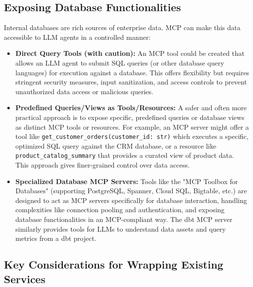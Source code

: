 \subsection*{Exposing Database Functionalities}
Internal databases are rich sources of enterprise data. MCP can make this data accessible to LLM agents in a controlled manner:

\begin{itemize}
    \item \textbf{Direct Query Tools (with caution):} An MCP tool could be created that allows an LLM agent to submit SQL queries 
    (or other database query languages) for execution against a database. This offers flexibility but requires stringent security measures, input sanitization,
     and access controls to prevent unauthorized data access or malicious queries.
    \item \textbf{Predefined Queries/Views as Tools/Resources:} A safer and often more practical approach is to expose specific, predefined 
    queries or database views as distinct MCP tools or resources. For example, an MCP server might offer a tool like \texttt{get\_customer\_orders(customer\_id: str)} 
    which executes a specific, optimized SQL query against the CRM database, or a resource like \texttt{product\_catalog\_summary} that provides 
    a curated view of product data. This approach gives finer-grained control over data access.
    \item \textbf{Specialized Database MCP Servers:} Tools like the "MCP Toolbox for Databases" (supporting PostgreSQL, Spanner, Cloud SQL, Bigtable, etc.) 
    are designed to act as MCP servers specifically for database interaction, handling complexities like connection pooling and authentication, 
    and exposing database functionalities in an MCP-compliant way. The dbt MCP server similarly provides tools for LLMs to understand data assets 
    and query metrics from a dbt project.
\end{itemize}

\subsection*{Key Considerations for Wrapping Existing Services}

